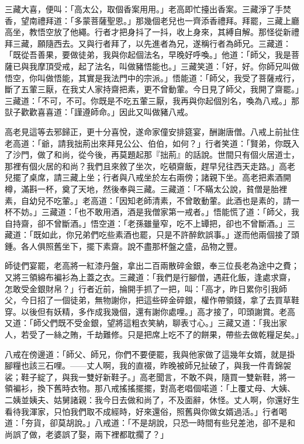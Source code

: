 三藏大喜，便叫：「高太公，取個香案用用。」老高即忙擡出香案。三藏淨了手焚香，望南禮拜道：「多蒙菩薩聖恩。」那幾個老兒也一齊添香禮拜。拜罷，三藏上廳高坐，教悟空放了他繩。行者才把身抖了一抖，收上身來，其縛自解。那怪從新禮拜三藏，願隨西去。又與行者拜了，以先進者為兄，遂稱行者為師兄。三藏道：「既從吾善果，要做徒弟，我與你起個法名，早晚好呼喚。」他道：「師父，我是菩薩已與我摩頂受戒，起了法名，叫做豬悟能也。」三藏笑道：「好，好。你師兄叫做悟空，你叫做悟能，其實是我法門中的宗派。」悟能道：「師父，我受了菩薩戒行，斷了五葷三厭，在我丈人家持齋把素，更不曾動葷。今日見了師父，我開了齋罷。」三藏道：「不可，不可。你既是不吃五葷三厭，我再與你起個別名，喚為八戒。」那獃子歡歡喜喜道：「謹遵師命。」因此又叫做豬八戒。

高老見這等去邪歸正，更十分喜悅，遂命家僮安排筵宴，酬謝唐僧。八戒上前扯住老高道：「爺，請我拙荊出來拜見公公、伯伯，如何？」行者笑道：「賢弟，你既入了沙門，做了和尚，從今後，再莫題起那『拙荊』的話說。世間只有個火居道士，那裡有個火居的和尚？我們且來敘了坐次，吃頓齋飯，趕早兒往西天走路。」高老兒擺了桌席，請三藏上坐；行者與八戒坐於左右兩傍；諸親下坐。高老把素酒開樽，滿斟一杯，奠了天地，然後奉與三藏。三藏道：「不瞞太公說，貧僧是胎裡素，自幼兒不吃葷。」老高道：「因知老師清素，不曾敢動葷。此酒也是素的，請一杯不妨。」三藏道：「也不敢用酒，酒是我僧家第一戒者。」悟能慌了道：「師父，我自持齋，卻不曾斷酒。」悟空道：「老孫雖量窄，吃不上罈把，卻也不曾斷酒。」三藏道：「既如此，你兄弟們吃些素酒也罷，只是不許醉飲誤事。」遂而他兩個接了頭鍾。各人俱照舊坐下，擺下素齋。說不盡那杯盤之盛，品物之豐。

師徒們宴罷，老高將一紅漆丹盤，拿出二百兩散碎金銀，奉三位長老為途中之費；又將三領綿布褊衫為上蓋之衣。三藏道：「我們是行腳僧，遇莊化飯，逢處求齋，怎敢受金銀財帛？」行者近前，掄開手抓了一把，叫：「高才，昨日累你引我師父，今日招了一個徒弟，無物謝你，把這些碎金碎銀，權作帶領錢，拿了去買草鞋穿。以後但有妖精，多作成我幾個，還有謝你處哩。」高才接了，叩頭謝賞。老高又道：「師父們既不受金銀，望將這粗衣笑納，聊表寸心。」三藏又道：「我出家人，若受了一絲之賄，千劫難修。只是把席上吃不了的餅果，帶些去做乾糧足矣。」

八戒在傍邊道：「師父、師兄，你們不要便罷，我與他家做了這幾年女婿，就是掛腳糧也該三石哩。——丈人啊，我的直裰，昨晚被師兄扯破了，與我一件青錦袈裟；鞋子綻了，與我一雙好新鞋子。」高老聞言，不敢不與，隨買一雙新鞋，將一領褊衫，換下舊時衣物。那八戒搖搖擺擺，對高老唱個喏道：「上覆丈母、大姨、二姨並姨夫、姑舅諸親：我今日去做和尚了，不及面辭，休怪。丈人啊，你還好生看待我渾家，只怕我們取不成經時，好來還俗，照舊與你做女婿過活。」行者喝道：「夯貨，卻莫胡說。」八戒道：「不是胡說，只恐一時間有些兒差池，卻不是和尚誤了做，老婆誤了娶，兩下裡都耽擱了？」

